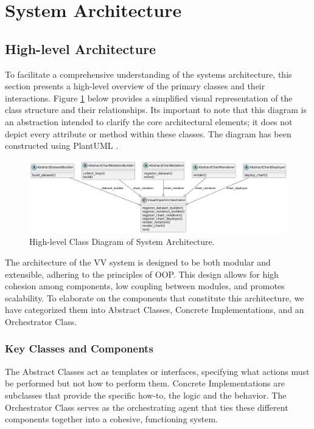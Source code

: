 \section{System Architecture}\label{system-architecture}

\subsection{High-level Architecture}\label{high-level-architecture}

To facilitate a comprehensive understanding of the
system\textquotesingle s architecture, this section presents a
high-level overview of the primary classes and their interactions.
Figure \ref{fig:class_diag1} below provides a simplified visual representation of the class
structure and their relationships. It\textquotesingle s important to
note that this diagram is an abstraction intended to clarify the core
architectural elements; it does not depict every attribute or method
within these classes. The diagram has been constructed using PlantUML
\cite{48}.

\begin{figure}[ht]
  \centering
  \includegraphics[width=\textwidth]{media/fig8.png}
  \caption{High-level Class Diagram of System Architecture.}
  \label{fig:class_diag1}
\end{figure}

The architecture of the VV system is designed to be both modular and
extensible, adhering to the principles of OOP. This design allows for
high cohesion among components, low coupling between modules, and
promotes scalability. To elaborate on the components that constitute
this architecture, we have categorized them into Abstract Classes,
Concrete Implementations, and an Orchestrator Class.

\subsubsection{Key Classes and
Components}\label{key-classes-and-components}

The Abstract Classes act as templates or interfaces, specifying what
actions must be performed but not how to perform them. Concrete
Implementations are subclasses that provide the specific
\textquotesingle how-to\textquotesingle, the logic and the behavior. The
Orchestrator Class serves as the orchestrating agent that ties these
different components together into a cohesive, functioning system.


